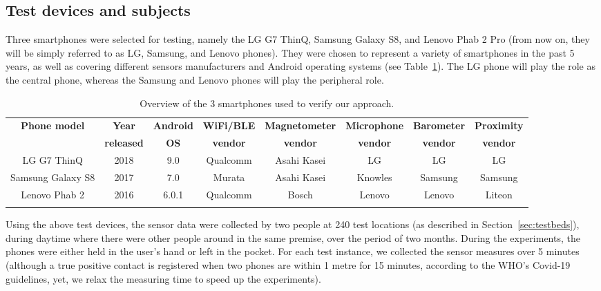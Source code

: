 \documentclass[graybox]{svmult}
\begin{document}
\subsection{Test devices and subjects}
\label{sec:devices}
Three smartphones were selected for testing, namely the LG G7 ThinQ, Samsung Galaxy S8, and Lenovo Phab 2 Pro (from now on, they will be simply referred to as LG, Samsung, and Lenovo phones). They were chosen to represent a variety of smartphones in the past 5 years, as well as covering different sensors manufacturers and Android operating systems (see Table~\ref{phones}). The LG phone will play the role as the central phone, whereas the Samsung and Lenovo phones will play the peripheral role.
\begin{table}[h]
	\caption{Overview of the 3 smartphones used to verify our approach.}
	\centering
	\begin{tabular}{c c c c c c c c}
		\toprule
		\textbf{Phone model} & \textbf{Year} & \textbf{Android} & \textbf{WiFi/BLE} & \textbf{Magnetometer} & \textbf{Microphone} & \textbf{Barometer} & \textbf{Proximity} \\
		\textbf{} & \textbf{released} & \textbf{OS} & \textbf{vendor} & \textbf{vendor} & \textbf{vendor} & \textbf{vendor} & \textbf{vendor} \\
		\midrule
		LG G7 ThinQ & 2018 & 9.0 & Qualcomm & Asahi Kasei & LG & LG & LG \\ \addlinespace[0.2cm]
		Samsung Galaxy S8 & 2017 & 7.0 & Murata & Asahi Kasei & Knowles & Samsung & Samsung \\ \addlinespace[0.2cm]
		Lenovo Phab 2 & 2016 & 6.0.1 & Qualcomm & Bosch & Lenovo & Lenovo & Liteon \\ \addlinespace[0.2cm]
		\bottomrule
	\end{tabular}
	\label{phones}
\end{table}

Using the above test devices, the sensor data were collected by two people at 240 test locations (as described in Section~\ref{sec:testbeds}), during daytime where there were other people around in the same premise, over the period of two months. During the experiments, the phones were either held in the user's hand or left in the pocket. For each test instance, we collected the sensor measures over 5 minutes (although a true positive contact is registered when two phones are within 1 metre for 15 minutes, according to the WHO's Covid-19 guidelines, yet, we relax the measuring time to speed up the experiments).
\end{document}
